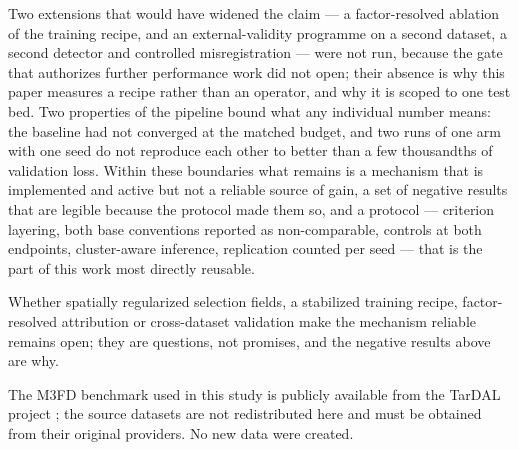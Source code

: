 \documentclass[pdflatex,sn-mathphys-num]{sn-jnl}
\theoremstyle{thmstyleone}%
\theoremstyle{thmstyletwo}%
\theoremstyle{thmstylethree}%
\begin{document}
Two extensions that would have widened the claim --- a factor-resolved ablation of the training recipe, and an external-validity programme on a second dataset, a second detector and controlled misregistration --- were not run, because the gate that authorizes further performance work did not open; their absence is why this paper measures a recipe rather than an operator, and why it is scoped to one test bed. Two properties of the pipeline bound what any individual number means: the baseline had not converged at the matched budget, and two runs of one arm with one seed do not reproduce each other to better than a few thousandths of validation loss. Within these boundaries what remains is a mechanism that is implemented and active but not a reliable source of gain, a set of negative results that are legible because the protocol made them so, and a protocol --- criterion layering, both base conventions reported as non-comparable, controls at both endpoints, cluster-aware inference, replication counted per seed --- that is the part of this work most directly reusable.

Whether spatially regularized selection fields, a stabilized training recipe, factor-resolved attribution or cross-dataset validation make the mechanism reliable remains open; they are questions, not promises, and the negative results above are why.

\backmatter

The M3FD benchmark used in this study is publicly available from the TarDAL project \cite{liu2022tardal}; the source datasets are not redistributed here and must be obtained from their original providers. No new data were created.
\end{document}
